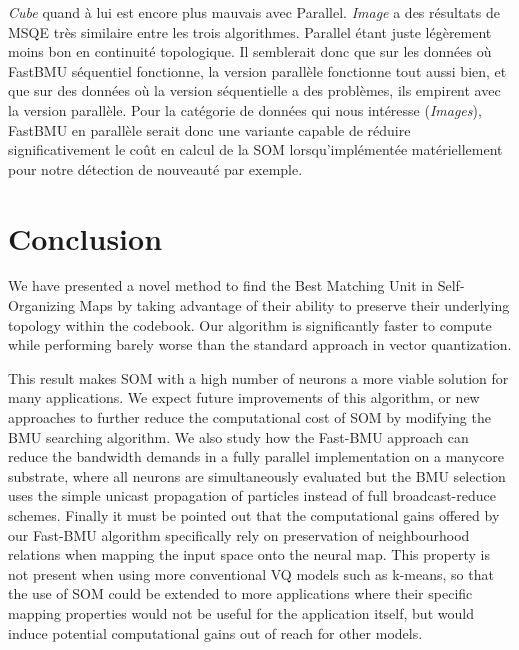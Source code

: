 	\textit{Cube} quand à lui est encore plus mauvais avec Parallel. \textit{Image} a des résultats de MSQE très similaire entre les trois algorithmes. Parallel étant juste légèrement moins bon en continuité topologique. Il semblerait donc que sur les données où FastBMU séquentiel fonctionne, la version parallèle fonctionne tout aussi bien, et que sur des données où la version séquentielle a des problèmes, ils empirent avec la version parallèle. Pour la catégorie de données qui nous intéresse (\textit{Images}), FastBMU en parallèle serait donc une variante capable de réduire significativement le coût en calcul de la SOM lorsqu'implémentée matériellement pour notre détection de nouveauté par exemple.

	\section{Conclusion}

	We have presented a novel method to find the Best Matching Unit in Self-Organizing Maps by taking advantage of their ability to preserve their underlying topology within the codebook. Our algorithm is significantly faster to compute while performing barely worse than the standard approach in vector quantization. %

	This result makes SOM with a high number of neurons a more viable solution for many applications. We expect future improvements of this algorithm, or new approaches to further reduce the computational cost of SOM by modifying the BMU searching algorithm. We also study how the Fast-BMU approach can reduce the bandwidth demands in a fully parallel implementation on a manycore substrate, where all neurons are simultaneously evaluated but the BMU selection uses the simple unicast propagation of particles instead of full broadcast-reduce schemes. Finally it must be pointed out that the computational gains offered by our Fast-BMU algorithm specifically rely on preservation of neighbourhood relations when mapping the input space onto the neural map. This property is not present when using more conventional VQ models such as k-means, so that the use of SOM could be extended to more applications where their specific mapping properties would not be useful for the application itself, but would induce potential computational gains out of reach for other models.
		

